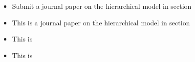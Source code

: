 \documentclass[]{article}
\begin{document}
\begin{itemize}
  \item[] Submit a journal paper on the hierarchical model in section 
  \item[] This is  a journal paper on the hierarchical model in section 
  \item[] This is 
  \item[] This is 
\end{itemize}
\end{document}
